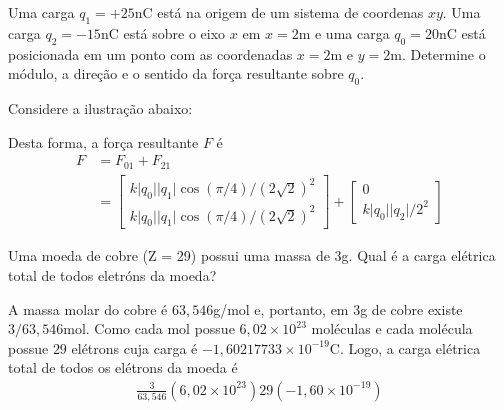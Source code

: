 \documentclass[a4paper,12pt, leqno, answers]{exam}
\newcommand{\abs}[1]{\lvert #1 \rvert}
\begin{document}
\begin{questions}
  \question Uma carga $q_1 = +25$nC est\'{a} na origem de um sistema de
  coordenas $xy$. Uma carga $q_2 = -15$nC est\'{a} sobre o eixo $x$ em $x = 2$m
  e uma carga $q_0 = 20$nC est\'{a} posicionada em um ponto com as
  coordenadas $x = 2$m e $y = 2$m. Determine o m\'{o}dulo, a dire\c{c}\~{a}o e
  o sentido da for\c{c}a resultante sobre $q_0$.
  \begin{solution}
    Considere a ilustra\c{c}\~{a}o abaixo:
    \begin{center}
    \end{center}
    Desta forma, a for\c{c}a resultante $F$ \'{e}
    \begin{align*}
      F &= F_{01} + F_{21} \\
      &= \begin{bmatrix}
        k \abs{q_0} \abs{q_1} \cos(\pi/4) / (2\sqrt{2})^2 \\
        k \abs{q_0} \abs{q_1} \cos(\pi/4) / (2\sqrt{2})^2
      \end{bmatrix} + \begin{bmatrix}
        0 \\
        k \abs{q_0} \abs{q_2} / 2^2
      \end{bmatrix}
    \end{align*}
  \end{solution}

  \question Uma moeda de cobre (Z = 29) possui uma massa de $3$g. Qual \'{e} a
  carga el\'{e}trica total de todos eletr\'{o}ns da moeda?
  \begin{solution}
    A massa molar do cobre \'{e} $63,546$g/mol e, portanto, em $3$g de cobre
    existe $3/63,546$mol. Como cada mol possue $6,02 \times 10^{23}$
    mol\'{e}culas e cada mol\'{e}cula possue $29$ el\'{e}trons cuja carga \'{e}
    $-1,60217733 \times 10^{-19}$C. Logo, a carga el\'{e}trica total de todos os
    el\'{e}trons da moeda \'{e}
    \begin{align*}
      \frac{3}{63,546} \left( 6,02 \times 10^{23} \right) 29 \left( -1,60 \times
      10^{-19} \right)
    \end{align*}
  \end{solution}


\end{questions}
\end{document}

